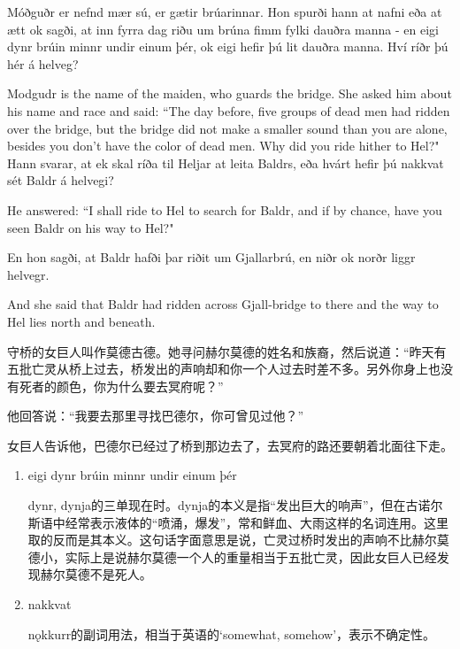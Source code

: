 \begin{paracol}{2}
    Móðguðr er nefnd mær sú, er gætir brúarinnar. Hon spurði hann at nafni eða at ætt ok sagði, at inn fyrra dag riðu um brúna fimm fylki dauðra manna - en eigi dynr brúin minnr undir einum þér, ok eigi hefir þú lit dauðra manna. Hví ríðr þú hér á helveg?
    \switchcolumn

    Modgudr is the name of the maiden, who guards the bridge. She asked him about his name and race and said: ``The day before, five groups of dead men had ridden over the bridge, but the bridge did not make a smaller sound than you are alone, besides you don't have the color of dead men. Why did you ride hither to Hel?"
    \switchcolumn*
    Hann svarar, at ek skal ríða til Heljar at leita Baldrs, eða hvárt hefir þú nakkvat sét Baldr á helvegi?

    \switchcolumn

    He answered: ``I shall ride to Hel to search for Baldr, and if by chance, have you seen Baldr on his way to Hel?"

    \switchcolumn*
    En hon sagði, at Baldr hafði þar riðit um Gjallarbrú, en niðr ok norðr liggr helvegr.

    \switchcolumn
    And she said that Baldr had ridden across Gjall-bridge to there and the way to Hel lies north and beneath.
\end{paracol}
\begin{translation*}{}
    守桥的女巨人叫作莫德古德。她寻问赫尔莫德的姓名和族裔，然后说道：“昨天有五批亡灵从桥上过去，桥发出的声响却和你一个人过去时差不多。另外你身上也没有死者的颜色，你为什么要去冥府呢？”

    他回答说：“我要去那里寻找巴德尔，你可曾见过他？”

    女巨人告诉他，巴德尔已经过了桥到那边去了，去冥府的路还要朝着北面往下走。
\end{translation*}
\begin{grammar*}{}
    \begin{enumerate}[leftmargin=*]
        \item eigi dynr brúin minnr undir einum þér

              dynr, dynja的三单现在时。dynja的本义是指“发出巨大的响声”，但在古诺尔斯语中经常表示液体的“喷涌，爆发”，常和鲜血、大雨这样的名词连用。这里取的反而是其本义。这句话字面意思是说，亡灵过桥时发出的声响不比赫尔莫德小，实际上是说赫尔莫德一个人的重量相当于五批亡灵，因此女巨人已经发现赫尔莫德不是死人。

        \item nakkvat

              nǫkkurr的副词用法，相当于英语的`somewhat, somehow'，表示不确定性。
    \end{enumerate}
\end{grammar*}
